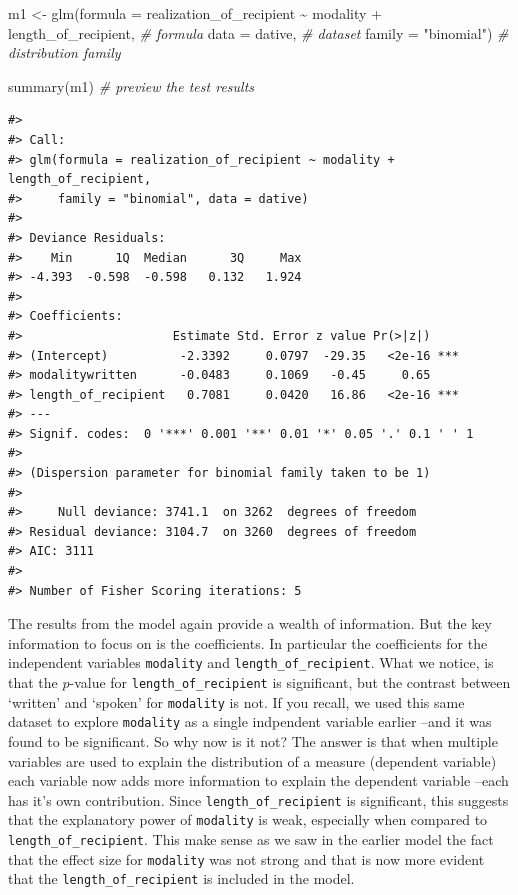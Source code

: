\documentclass[
  letterpaper,
]{scrbook}
\newenvironment{Shaded}{\begin{snugshade}}{\end{snugshade}}
\newcommand{\AttributeTok}[1]{\textcolor[rgb]{0.00,0.00,0.00}{#1}}
\newcommand{\CommentTok}[1]{\textcolor[rgb]{0.00,0.00,0.00}{\textit{#1}}}
\newcommand{\FunctionTok}[1]{\textcolor[rgb]{0.00,0.00,0.00}{#1}}
\newcommand{\NormalTok}[1]{\textcolor[rgb]{0.00,0.00,0.00}{#1}}
\newcommand{\OtherTok}[1]{\textcolor[rgb]{0.00,0.00,0.00}{#1}}
\newcommand{\SpecialCharTok}[1]{\textcolor[rgb]{0.00,0.00,0.00}{#1}}
\newcommand{\StringTok}[1]{\textcolor[rgb]{0.00,0.00,0.00}{#1}}
\begin{document}
\begin{Shaded}
\begin{Highlighting}[]
\NormalTok{m1 }\OtherTok{\textless{}{-}} \FunctionTok{glm}\NormalTok{(}\AttributeTok{formula =}\NormalTok{ realization\_of\_recipient }\SpecialCharTok{\textasciitilde{}}\NormalTok{ modality }\SpecialCharTok{+}\NormalTok{ length\_of\_recipient, }\CommentTok{\# formula}
          \AttributeTok{data =}\NormalTok{ dative, }\CommentTok{\# dataset}
          \AttributeTok{family =} \StringTok{"binomial"}\NormalTok{) }\CommentTok{\# distribution family}

\FunctionTok{summary}\NormalTok{(m1) }\CommentTok{\# preview the test results}
\end{Highlighting}
\end{Shaded}

\begin{verbatim}
#> 
#> Call:
#> glm(formula = realization_of_recipient ~ modality + length_of_recipient, 
#>     family = "binomial", data = dative)
#> 
#> Deviance Residuals: 
#>    Min      1Q  Median      3Q     Max  
#> -4.393  -0.598  -0.598   0.132   1.924  
#> 
#> Coefficients:
#>                     Estimate Std. Error z value Pr(>|z|)    
#> (Intercept)          -2.3392     0.0797  -29.35   <2e-16 ***
#> modalitywritten      -0.0483     0.1069   -0.45     0.65    
#> length_of_recipient   0.7081     0.0420   16.86   <2e-16 ***
#> ---
#> Signif. codes:  0 '***' 0.001 '**' 0.01 '*' 0.05 '.' 0.1 ' ' 1
#> 
#> (Dispersion parameter for binomial family taken to be 1)
#> 
#>     Null deviance: 3741.1  on 3262  degrees of freedom
#> Residual deviance: 3104.7  on 3260  degrees of freedom
#> AIC: 3111
#> 
#> Number of Fisher Scoring iterations: 5
\end{verbatim}

The results from the model again provide a wealth of information. But
the key information to focus on is the coefficients. In particular the
coefficients for the independent variables \texttt{modality} and
\texttt{length\_of\_recipient}. What we notice, is that the \(p\)-value
for \texttt{length\_of\_recipient} is significant, but the contrast
between `written' and `spoken' for \texttt{modality} is not. If you
recall, we used this same dataset to explore \texttt{modality} as a
single indpendent variable earlier --and it was found to be significant.
So why now is it not? The answer is that when multiple variables are
used to explain the distribution of a measure (dependent variable) each
variable now adds more information to explain the dependent variable
--each has it's own contribution. Since \texttt{length\_of\_recipient}
is significant, this suggests that the explanatory power of
\texttt{modality} is weak, especially when compared to
\texttt{length\_of\_recipient}. This make sense as we saw in the earlier
model the fact that the effect size for \texttt{modality} was not strong
and that is now more evident that the \texttt{length\_of\_recipient} is
included in the model.
\end{document}
